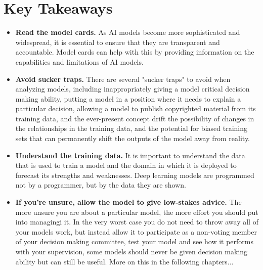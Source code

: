 \section{Key Takeaways}

\begin{itemize}
    \item \textbf{Read the model cards.} As AI models become more sophisticated and widespread, it is essential to ensure that they are transparent and accountable. Model cards can help with this by providing information on the capabilities and limitations of AI models.
    \item \textbf{Avoid sucker traps.} There are several "sucker traps" to avoid when analyzing models, including inappropriately giving a model critical decision making ability, putting a model in a position where it needs to explain a particular decision, allowing a model to publish copyrighted material from its training data, and the ever-present concept drift the possibility of changes in the relationships in the training data, and the potential for biased training sets that can permanently shift the outputs of the model away from reality.
    \item \textbf{Understand the training data.} It is important to understand the data that is used to train a model and the domain in which it is deployed to forecast its strengths and weaknesses. Deep learning models are programmed not by a programmer, but by the data they are shown.
    \item \textbf{If you're unsure, allow the model to give low-stakes advice.} The more unsure you are about a particular model, the more effort you should put into managingi it. In the very worst case you do not need to throw away all of your models work, but instead allow it to participate as a non-voting member of your decision making committee, test your model and see how it performs with your supervision, some models should never be given decision making ability but can still be useful. More on this in the following chapters...
\end{itemize}
